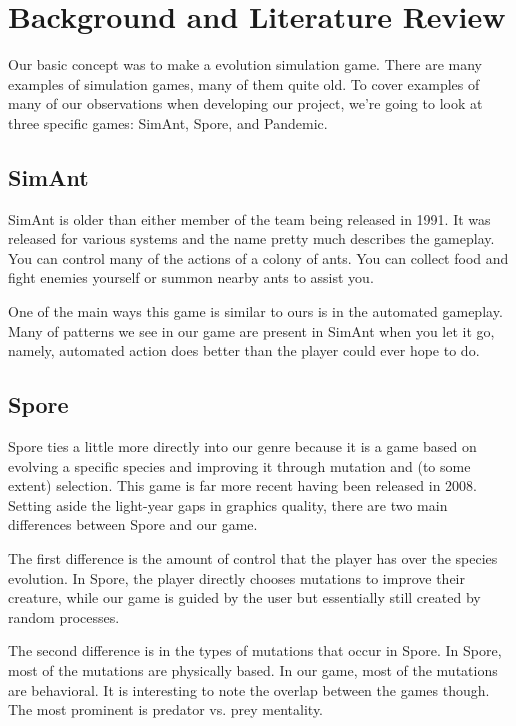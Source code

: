 
\chapter{Background and Literature Review}

Our basic concept was to make a evolution simulation game. There are many examples of simulation games, many of them quite old. To cover examples of many of our observations when developing our project, we're going to look at three specific games: SimAnt, Spore, and Pandemic.

\section{SimAnt}
SimAnt is older than either member of the team being released in 1991. It was released for various systems and the name pretty much describes the gameplay. You can control many of the actions of a colony of ants. You can collect food and fight enemies yourself or summon nearby ants to assist you.

One of the main ways this game is similar to ours is in the automated gameplay. Many of patterns we see in our game are present in SimAnt when you let it go, namely, automated action does better than the player could ever hope to do.


\section{Spore}
Spore ties a little more directly into our genre because it is a game based on evolving a specific species and improving it through mutation and (to some extent) selection. This game is far more recent having been released in 2008. Setting aside the light-year gaps in graphics quality, there are two main differences between Spore and our game.

The first difference is the amount of control that the player has over the species evolution. In Spore, the player directly chooses mutations to improve their creature, while our game is guided by the user but essentially still created by random processes.

The second difference is in the types of mutations that occur in Spore. In Spore, most of the mutations are physically based. In our game, most of the mutations are behavioral. It is interesting to note the overlap between the games though. The most prominent is predator vs. prey mentality.


